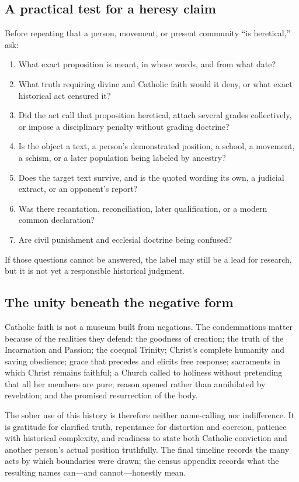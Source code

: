 \subsection{A practical test for a heresy claim}

Before repeating that a person, movement, or present community ``is heretical,'' ask:

\begin{enumerate}[leftmargin=1.5em,itemsep=0.25em]
  \item What exact proposition is meant, in whose words, and from what date?
  \item What truth requiring divine and Catholic faith would it deny, or what exact historical act censured it?
  \item Did the act call that proposition heretical, attach several grades collectively, or impose a disciplinary penalty without grading doctrine?
  \item Is the object a text, a person's demonstrated position, a school, a movement, a schism, or a later population being labeled by ancestry?
  \item Does the target text survive, and is the quoted wording its own, a judicial extract, or an opponent's report?
  \item Was there recantation, reconciliation, later qualification, or a modern common declaration?
  \item Are civil punishment and ecclesial doctrine being confused?
\end{enumerate}

If those questions cannot be answered, the label may still be a lead for research, but it is not yet a responsible historical judgment.

\subsection{The unity beneath the negative form}

Catholic faith is not a museum built from negations. The condemnations matter because of the realities they defend: the goodness of creation; the truth of the Incarnation and Passion; the coequal Trinity; Christ's complete humanity and saving obedience; grace that precedes and elicits free response; sacraments in which Christ remains faithful; a Church called to holiness without pretending that all her members are pure; reason opened rather than annihilated by revelation; and the promised resurrection of the body.

The sober use of this history is therefore neither name-calling nor indifference. It is gratitude for clarified truth, repentance for distortion and coercion, patience with historical complexity, and readiness to state both Catholic conviction and another person's actual position truthfully. The final timeline records the many acts by which boundaries were drawn; the census appendix records what the resulting names can---and cannot---honestly mean.
